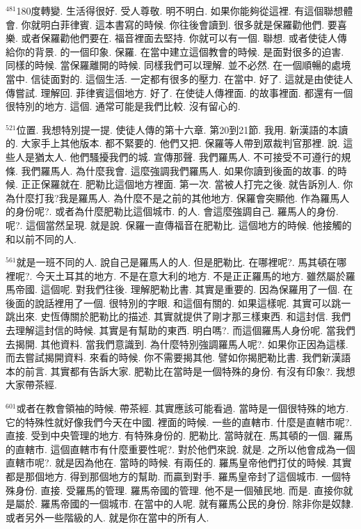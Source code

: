 \documentclass{book}
\begin{document}
$^{481}$180度轉變.
生活得很好.
受人尊敬.
明不明白.
如果你能夠從這裡.
有這個聯想體會.
你就明白菲律賓.
這本書寫的時候.
你往後會讀到.
很多就是保羅勸他們.
要喜樂.
或者保羅勸他們要在.
福音裡面去堅持.
你就可以有一個.
聯想.
或者使徒人傳給你的背景.
的一個印象.
保羅.
在當中建立這個教會的時候.
是面對很多的迫害.
同樣的時候.
當保羅離開的時候.
同樣我們可以理解.
並不必然.
在一個順暢的處境當中.
信徒面對的.
這個生活.
一定都有很多的壓力.
在當中.
好了.
這就是由使徒人傳嘗試.
理解回.
菲律賓這個地方.
好了.
在使徒人傳裡面.
的故事裡面.
都還有一個很特別的地方.
這個.
通常可能是我們比較.
沒有留心的.

$^{521}$位置.
我想特別提一提.
使徒人傳的第十六章.
第20到21節.
我用.
新漢語的本讀的.
大家手上其他版本.
都不緊要的.
他們又把.
保羅等人帶到眾裁判官那裡.
說.
這些人是猶太人.
他們騷擾我們的城.
宣傳那聲.
我們羅馬人.
不可接受不可遵行的規條.
我們羅馬人.
為什麼我會.
這麼強調我們羅馬人.
如果你讀到後面的故事.
的時候.
正正保羅就在.
肥勒比這個地方裡面.
第一次.
當被人打完之後.
就告訴別人.
你為什麼打我?我是羅馬人.
為什麼不是之前的其他地方.
保羅會突顯他.
作為羅馬人的身份呢?.
或者為什麼肥勒比這個城市.
的人.
會這麼強調自己.
羅馬人的身份.
呢?.
這個當然呈現.
就是說.
保羅一直傳福音在肥勒比.
這個地方的時候.
他接觸的和以前不同的人.

$^{561}$就是一班不同的人.
說自己是羅馬人的人.
但是肥勒比.
在哪裡呢?.
馬其頓在哪裡呢?.
今天土耳其的地方.
不是在意大利的地方.
不是正正羅馬的地方.
雖然屬於羅馬帝國.
這個呢.
對我們往後.
理解肥勒比書.
其實是重要的.
因為保羅用了一個.
在後面的說話裡用了一個.
很特別的字眼.
和這個有關的.
如果這樣呢.
其實可以跳一跳出來.
史恆傳關於肥勒比的描述.
其實就提供了剛才那三樣東西.
和這封信.
我們去理解這封信的時候.
其實是有幫助的東西.
明白嗎?.
而這個羅馬人身份呢.
當我們去揭開.
其他資料.
當我們意識到.
為什麼特別強調羅馬人呢?.
如果你正因為這樣.
而去嘗試揭開資料.
來看的時候.
你不需要揭其他.
譬如你揭肥勒比書.
我們新漢語本的前言.
其實都有告訴大家.
肥勒比在當時是一個特殊的身份.
有沒有印象?.
我想大家帶茶經.

$^{601}$或者在教會領袖的時候.
帶茶經.
其實應該可能看過.
當時是一個很特殊的地方.
它的特殊性就好像我們今天在中國.
裡面的時候.
一些的直轄市.
什麼是直轄市呢?.
直接.
受到中央管理的地方.
有特殊身份的.
肥勒比.
當時就在.
馬其頓的一個.
羅馬的直轄市.
這個直轄市有什麼重要性呢?.
對於他們來說.
就是.
之所以他會成為一個直轄市呢?.
就是因為他在.
當時的時候.
有兩任的.
羅馬皇帝他們打仗的時候.
其實都是那個地方.
得到那個地方的幫助.
而贏到對手.
羅馬皇帝封了這個城市.
一個特殊身份.
直接.
受羅馬的管理.
羅馬帝國的管理.
他不是一個殖民地.
而是.
直接你就是屬於.
羅馬帝國的一個城市.
在當中的人呢.
就有羅馬公民的身份.
除非你是奴隸.
或者另外一些階級的人.
就是你在當中的所有人.
\end{document}
